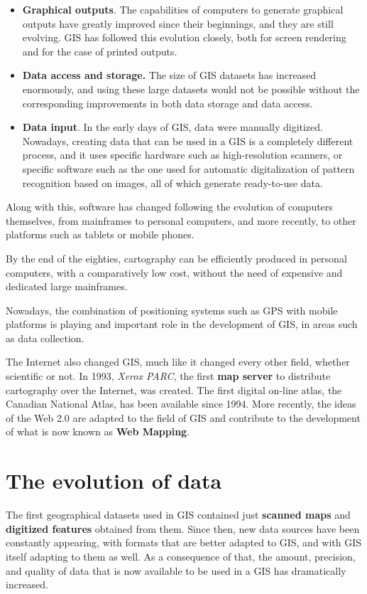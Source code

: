 \begin{itemize}
 \item \textbf{Graphical outputs}. The capabilities of computers to generate graphical outputs have greatly improved since their beginnings, and they are still evolving. GIS has followed this evolution closely, both for screen rendering and for the case of printed outputs.
\item \textbf{Data access and storage.} The size of GIS datasets has increased enormously, and using these large datasets would not be possible without the corresponding improvements in both data storage and data access.
\item \textbf{Data input}. In the early days of GIS, data were manually digitized. Nowadays, creating data that can be used in a GIS is a completely different process, and it uses specific hardware such as high-resolution scanners, or specific software such as the one used for automatic digitalization of pattern recognition based on images, all of which generate ready-to-use data.
\end{itemize}

Along with this, software has changed following the evolution of computers themselves, from mainframes to personal computers, and more recently, to other platforms such as tablets or mobile phones.

By the end of the eighties, cartography can be efficiently produced in personal computers, with a comparatively low cost, without the need of expensive and dedicated large mainframes.

Nowadays, the combination of positioning systems such as GPS with mobile platforms is playing and important role in the development of GIS, in areas such as data collection.

The Internet also changed GIS, much like it changed every other field, whether scientific or not. In 1993, \emph{Xerox PARC}, the first \textbf{map server} to distribute cartography over the Internet, was created. The first digital on-line atlas, the Canadian National Atlas, has been available since 1994. More recently, the ideas of the Web 2.0 are adapted to the field of GIS and contribute to the development of what is now known as \textbf{Web Mapping}.

\section{The evolution of data}

The first geographical datasets used in GIS contained just \textbf{scanned maps} and \textbf{digitized features} obtained from them. Since then, new data sources have been constantly appearing, with formats that are better adapted to GIS, and with GIS itself adapting to them as well. As a consequence of that, the amount, precision, and quality of data that is now available to be used in a GIS has dramatically increased.

